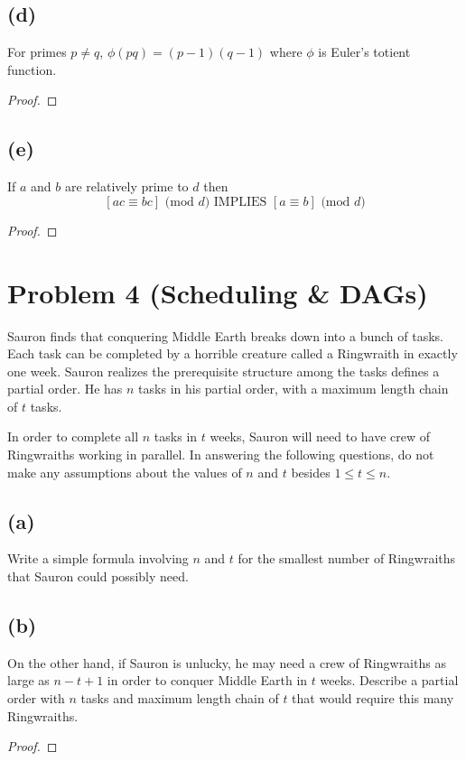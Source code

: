 \documentclass[14pt]{extarticle}
\begin{document}
\subsection{(d)}
For primes $p \neq q$, $\phi(pq) = (p-1)(q-1)$ where $\phi$ is Euler's totient function.
\begin{proof}
\end{proof}

\subsection{(e)}
If $a$ and $b$ are relatively prime to $d$ then
$$
[ac \equiv bc] \text{ (mod $d$)} \text{ IMPLIES } [a \equiv b] \text{ (mod $d$)}
$$
\begin{proof}
\end{proof}

\section{Problem 4 (Scheduling \& DAGs)}
Sauron finds that conquering Middle Earth breaks down into a bunch of tasks. Each task can be completed by a horrible creature called a Ringwraith in exactly one week. Sauron realizes the prerequisite structure among the tasks defines a partial order. He has $n$ tasks in his partial order, with a maximum length chain of $t$ tasks.

In order to complete all $n$ tasks in $t$ weeks, Sauron will need to have crew of Ringwraiths working in parallel. In answering the following questions, do not make any assumptions about the values of $n$ and $t$ besides $1 \leq t \leq n$.

\subsection{(a)} 
Write a simple formula involving $n$ and $t$ for the smallest number of Ringwraiths that Sauron could possibly need.

\subsection{(b)} On the other hand, if Sauron is unlucky, he may need a crew of Ringwraiths as large as $n - t + 1$ in order to conquer Middle Earth in $t$ weeks. Describe a partial order with $n$ tasks and maximum length chain of $t$ that would require this many Ringwraiths.
\begin{proof}
\end{proof}
\end{document}
